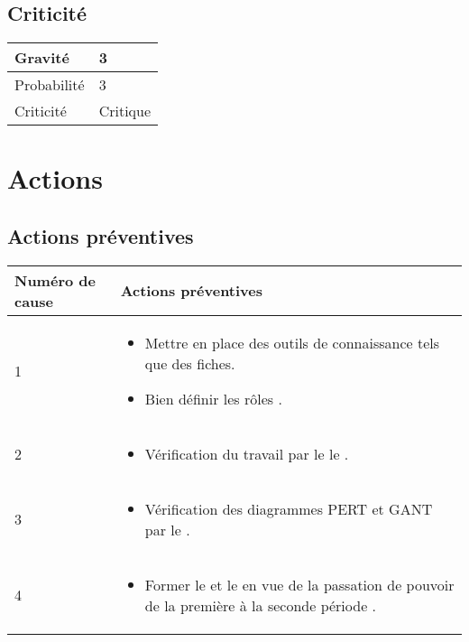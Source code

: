 \subsection*{Criticité}

\begin{table}[H]
\centering
	\begin{tabularx}{16.8cm}{|>{\columncolor{gray!40}}X|X|}
	\hline
	Gravité & 3\\
	\hline
	Probabilité & 3\\
	\hline
	Criticité & Critique \\
	\hline
	\end{tabularx}
\end{table}
\newpage

\section*{Actions}
\subsection*{Actions préventives}

\centering
	\begin{longtable}{|p{7cm}|p{7cm}|}
	\hline
	\rowcolor{gray!40} Numéro de cause & Actions préventives \\
	\hline
	 1 & \begin{itemize}
	 	\item Mettre en place des outils de connaissance tels que des fiches. 
	 	\item Bien définir les rôles .
	 \end{itemize} \\
	\hline
	2 & \begin{itemize}
		\item Vérification du travail par le le \RD .
	\end{itemize}	 \\
	\hline
	3 & \begin{itemize}
		\item Vérification des diagrammes PERT et GANT par le \CPA .
	\end{itemize} \\
	\hline
	4 & \begin{itemize}
		\item Former le \CPA{} et le \RQA{} en vue de la passation de pouvoir de la première à la seconde période . 
	\end{itemize} \\
	\hline
	
	\end{longtable}


